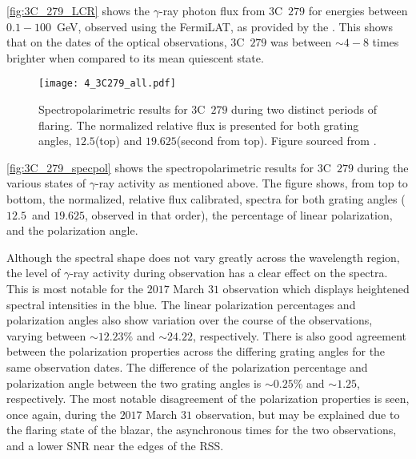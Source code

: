 \autoref{fig:3C_279_LCR} shows the $\gamma$-ray photon flux from 3C~$279$ for energies between $0.1 - 100$~GeV, observed using the \gls{FermiLAT}, as provided by the  \citep{FermiLCR}.
This shows that on the dates of the optical observations, 3C~$279$ was between $\sim4 - 8$ times brighter when compared to its mean quiescent state. 

\begin{figure}[tp]
    \centering
    \texttt{[image: 4\_3C279\_all.pdf]}
    \caption{Spectropolarimetric results for 3C~$279$ during two distinct periods of flaring. The normalized relative flux is presented for both grating angles, $12.5$\degree (top) and $19.625$\degree (second from top). Figure sourced from \citep{Cooper_HEASA2022}.}
    \label{fig:3C_279_specpol}
\end{figure}

\autoref{fig:3C_279_specpol} shows the spectropolarimetric results for 3C~$279$ during the various states of $\gamma$-ray activity as mentioned above.
The figure shows, from top to bottom, the normalized, relative flux calibrated, spectra for both grating angles ($12.5$\degree\ and $19.625$\degree, observed in that order), the percentage of linear polarization, and the polarization angle.

Although the spectral shape does not vary greatly across the wavelength region, the level of $\gamma$-ray activity during observation has a clear effect on the spectra.
This is most notable for the $2017$ March $31$ observation which displays heightened spectral intensities in the blue.
The linear polarization percentages and polarization angles also show variation over the course of the observations, varying between $\sim 12.23\%$ and $\sim 24.22$\degree, respectively.
There is also good agreement between the polarization properties across the differing grating angles for the same observation dates.
The difference of the polarization percentage and polarization angle between the two grating angles is $\sim 0.25\%$ and $\sim 1.25$\degree, respectively.
The most notable disagreement of the polarization properties is seen, once again, during the $2017$ March $31$ observation, but may be explained due to the flaring state of the blazar, the asynchronous times for the two observations, and a lower \gls{SNR} near the edges of the \gls{RSS}.

